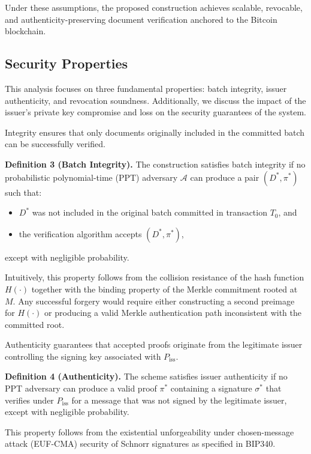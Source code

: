 \documentclass{IEEEoj}
\begin{document}
Under these assumptions, the proposed construction achieves scalable, revocable, and authenticity-preserving document verification anchored to the Bitcoin blockchain.

\subsection{Security Properties}

This analysis focuses on three fundamental properties: batch integrity, issuer authenticity, and revocation soundness. Additionally, we discuss the impact of the issuer's private key compromise and loss on the security guarantees of the system.

Integrity ensures that only documents originally included in the committed batch can be successfully verified.

\textbf{Definition 3 (Batch Integrity).}  
The construction satisfies batch integrity if no probabilistic polynomial-time (PPT) adversary $\mathcal{A}$ can produce a pair $(D^*, \pi^*)$ such that:

\begin{itemize}
    \item $D^*$ was not included in the original batch committed in transaction $T_0$, and
    \item the verification algorithm accepts $(D^*, \pi^*)$,
\end{itemize}

except with negligible probability.

Intuitively, this property follows from the collision resistance of the hash function $H(\cdot)$ together with the binding property of the Merkle commitment rooted at $M$. Any successful forgery would require either constructing a second preimage for $H(\cdot)$ or producing a valid Merkle authentication path inconsistent with the committed root.

Authenticity guarantees that accepted proofs originate from the legitimate issuer controlling the signing key associated with $P_{\mathrm{iss}}$.

\textbf{Definition 4 (Authenticity).}  
The scheme satisfies issuer authenticity if no PPT adversary can produce a valid proof $\pi^*$ containing a signature $\sigma^*$ that verifies under $P_{\mathrm{iss}}$ for a message that was not signed by the legitimate issuer, except with negligible probability.

This property follows from the existential unforgeability under chosen-message attack (EUF-CMA) security of Schnorr signatures as specified in BIP340.
\end{document}
